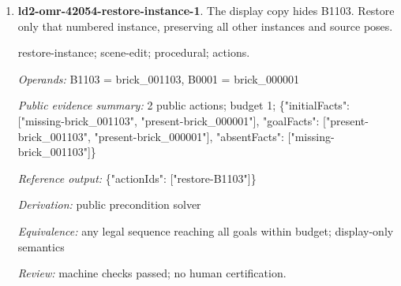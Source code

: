 \begin{enumerate}
\par{\small source-sequence; scene-edit; procedural; actions.\par\textit{Operands:} B0027 = brick\_000027, B0021 = brick\_000021, B0047 = brick\_000047, B0044 = brick\_000044, B0001 = brick\_000001, B0035 = brick\_000035, B0025 = brick\_000025, B0042 = brick\_000042, B0005 = brick\_000005, B0020 = brick\_000020, B0058 = brick\_000058, B0050 = brick\_000050, B0037 = brick\_000037, B0003 = brick\_000003, B0039 = brick\_000039, B0030 = brick\_000030, B0029 = brick\_000029, B0034 = brick\_000034, B0009 = brick\_000009, B0011 = brick\_000011, B0016 = brick\_000016, B0012 = brick\_000012, B0051 = brick\_000051, B0022 = brick\_000022, B0004 = brick\_000004, B0048 = brick\_000048, B0006 = brick\_000006, B0046 = brick\_000046, B0023 = brick\_000023, B0032 = brick\_000032, B0013 = brick\_000013, B0019 = brick\_000019, B0026 = brick\_000026, B0014 = brick\_000014, B0031 = brick\_000031, B0024 = brick\_000024, B0056 = brick\_000056, B0017 = brick\_000017, B0008 = brick\_000008, B0007 = brick\_000007, B0045 = brick\_000045, B0053 = brick\_000053, B0018 = brick\_000018, B0041 = brick\_000041, B0038 = brick\_000038, B0036 = brick\_000036, B0057 = brick\_000057, B0010 = brick\_000010, B0043 = brick\_000043, B0052 = brick\_000052, B0054 = brick\_000054, B0033 = brick\_000033, B0055 = brick\_000055, B0028 = brick\_000028, B0002 = brick\_000002, B0049 = brick\_000049, B0040 = brick\_000040, B0015 = brick\_000015\par\textit{Public evidence summary:} 6 public actions; budget 6; \{"initialFacts": ["start"], "goalFacts": ["done-6"], "absentFacts": []\}\par\textit{Reference output:} \{"actionIds": ["step-1", "step-2", "step-3", "step-4", "step-5", "step-6"]\}\par\textit{Derivation:} public precondition solver\par\textit{Equivalence:} any legal sequence reaching all goals within budget; display-only semantics\par\textit{Review:} pending required human review.}
\item \textbf{ld2-omr-42054-restore-instance-1}. The display copy hides B1103. Restore only that numbered instance, preserving all other instances and source poses.
\par{\small restore-instance; scene-edit; procedural; actions.\par\textit{Operands:} B1103 = brick\_001103, B0001 = brick\_000001\par\textit{Public evidence summary:} 2 public actions; budget 1; \{"initialFacts": ["missing-brick\_001103", "present-brick\_000001"], "goalFacts": ["present-brick\_001103", "present-brick\_000001"], "absentFacts": ["missing-brick\_001103"]\}\par\textit{Reference output:} \{"actionIds": ["restore-B1103"]\}\par\textit{Derivation:} public precondition solver\par\textit{Equivalence:} any legal sequence reaching all goals within budget; display-only semantics\par\textit{Review:} machine checks passed; no human certification.}

\end{enumerate}
